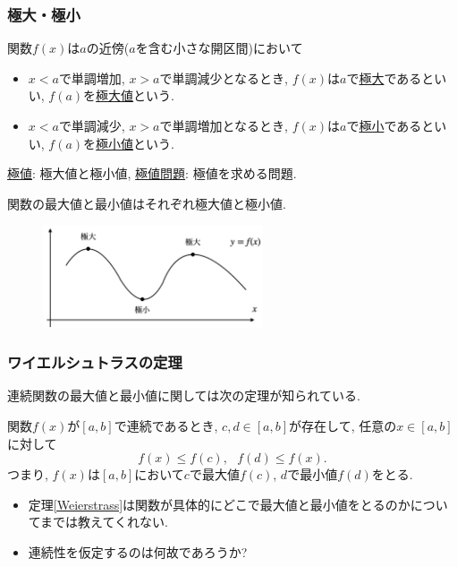 \begin{frame}
\frametitle{極大・極小}
\vspace{-2.5mm}

\begin{Def}
関数$f(x)$は$a$の近傍($a$を含む小さな開区間)において
\begin{itemize} 
\item $x<a$で単調増加,  $x>a$で単調減少となるとき, $f(x)$は$a$で\underline{極大}であるといい, $f(a)$を\underline{極大値}という.
\item  $x<a$で単調減少,  $x>a$で単調増加となるとき, $f(x)$は$a$で\underline{極小}であるといい, $f(a)$を\underline{極小値}という.
\end{itemize}
\underline{極値}: 極大値と極小値, \underline{極値問題}: 極値を求める問題. 
\end{Def}

関数の最大値と最小値はそれぞれ極大値と極小値. 

\vspace{-1mm}

 \begin{figure}[htbp]
 \begin{center} 
  \includegraphics[width=65mm]{calculus7/local_maxmin.png}
 \end{center}
\end{figure}

\end{frame}





\begin{frame}
\frametitle{ワイエルシュトラスの定理}



連続関数の最大値と最小値に関しては次の定理が知られている. 

\begin{Thm}[ワイエルシュトラスの定理] \label{Weierstrass}
関数$f(x)$が$[a,b]$で連続であるとき, $c,d\in [a,b]$が存在して, 任意の$x \in [a,b]$に対して
$$
f(x) \le f(c), \ \ \ f(d) \le f(x). 
$$
つまり, $f(x)$は$[a,b]$において$c$で最大値$f(c)$, $d$で最小値$f(d)$をとる. 
\end{Thm}
\begin{itemize}
\item 定理\ref{Weierstrass}は関数が具体的にどこで最大値と最小値をとるのかについてまでは教えてくれない. 
\item 連続性を仮定するのは何故であろうか? 
\end{itemize}
\end{frame}

